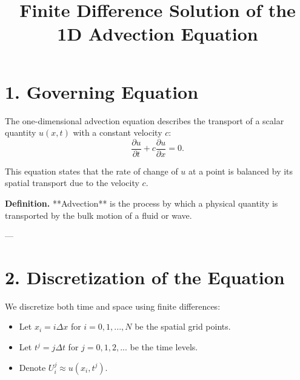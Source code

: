 \documentclass{article}
\begin{document}
\title{Finite Difference Solution of the 1D Advection Equation}
\author{}
\date{}
\maketitle

\section*{1. Governing Equation}

The one-dimensional advection equation describes the transport of a scalar quantity $u(x,t)$ with a constant velocity $c$:
\begin{equation}
\frac{\partial u}{\partial t} + c \frac{\partial u}{\partial x} = 0.
\tag{A}
\end{equation}

This equation states that the rate of change of $u$ at a point is balanced by its spatial transport due to the velocity $c$.

\vspace{0.5em}
\noindent\textbf{Definition.}  
**Advection** is the process by which a physical quantity is transported by the bulk motion of a fluid or wave.

---

\section*{2. Discretization of the Equation}

We discretize both time and space using finite differences:

\begin{itemize}
  \item Let $x_i = i \Delta x$ for $i = 0, 1, ..., N$ be the spatial grid points.
  \item Let $t^j = j \Delta t$ for $j = 0, 1, 2, ...$ be the time levels.
  \item Denote $U_i^j \approx u(x_i, t^j)$.
\end{itemize}
\end{document}
